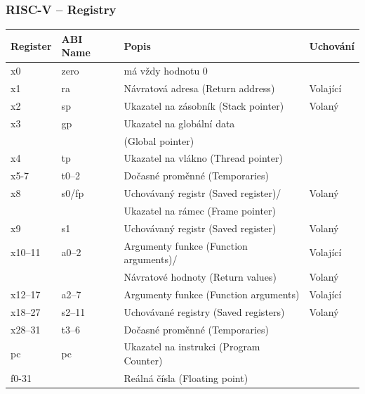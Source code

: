 \documentclass{beamer}
\begin{document}
\begin{frame}[shrink=12]
\frametitle{RISC-V -- Registry}
\begin{tabular}{|l|l|l|l|}\hline
Register & ABI Name & Popis & Uchování \\ \hline
x0 & zero & má vždy hodnotu 0 &  \\\hline
x1 & ra & Návratová adresa (Return address) & Volající \\\hline
x2 & sp & Ukazatel na zásobník (Stack pointer) &  Volaný\\\hline
x3 & gp & Ukazatel na globální data &  \\
   &    & (Global pointer) &  \\\hline
x4 & tp & Ukazatel na vlákno (Thread pointer) &  \\\hline
x5-7 & t0--2 & Dočasné proměnné (Temporaries) &  \\\hline
x8 & s0/fp & Uchovávaný registr (Saved register)/ & Volaný \\
   &       & Ukazatel na rámec (Frame pointer) &  \\\hline
x9 & s1 & Uchovávaný registr (Saved register) &  Volaný \\\hline
x10--11 & a0--2 & Argumenty funkce (Function arguments)/ &  Volající \\
 &  & Návratové hodnoty (Return values) &  Volaný \\\hline
x12--17 & a2--7 & Argumenty funkce (Function arguments) & Volající \\\hline
x18--27 & s2--11 & Uchovávané registry (Saved registers) & Volaný \\\hline
x28--31 & t3--6 & Dočasné proměnné (Temporaries) &  \\\hline
pc & pc & Ukazatel na instrukci (Program Counter) &  \\\hline
f0-31 &  & Reálná čísla (Floating point) &  \\\hline
\end{tabular}
\end{frame}
\end{document}
